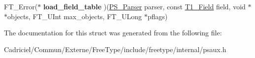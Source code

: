 \begin{DoxyCompactItemize}
\item 
F\+T\+\_\+\+Error($\ast$ {\bfseries load\+\_\+field\+\_\+table} )(\hyperlink{struct_p_s___parser_rec__}{P\+S\+\_\+\+Parser} parser, const \hyperlink{struct_t1___field_rec__}{T1\+\_\+\+Field} field, void $\ast$$\ast$objects, F\+T\+\_\+\+U\+Int max\+\_\+objects, F\+T\+\_\+\+U\+Long $\ast$pflags)\hypertarget{struct_p_s___parser___funcs_rec___a0952dd98193c4f73fe0a1281188ad395}{}\label{struct_p_s___parser___funcs_rec___a0952dd98193c4f73fe0a1281188ad395}

\end{DoxyCompactItemize}


The documentation for this struct was generated from the following file\+:\begin{DoxyCompactItemize}
\item 
Cadriciel/\+Commun/\+Externe/\+Free\+Type/include/freetype/internal/psaux.\+h\end{DoxyCompactItemize}
